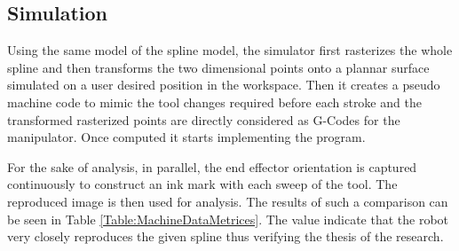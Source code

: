 \subsection{Simulation}
{
    Using the same model of the spline model, the simulator first rasterizes the whole spline and then transforms the two dimensional points onto a plannar surface simulated on a user desired position in the workspace. Then it creates a pseudo machine code to mimic the tool changes required before each stroke and the transformed rasterized points are directly considered as G-Codes for the manipulator. Once computed it starts implementing the program.

    For the sake of analysis, in parallel, the end effector orientation is captured continuously to construct an ink mark with each sweep of the tool. The reproduced image is then used for analysis. The results of such a comparison can be seen in Table \ref{Table:MachineDataMetrices}. The value indicate that the robot very closely reproduces the given spline thus verifying the thesis of the research.

    \begin{table}[ht]
    \centering
    \caption{Benchmark of the mathematical accuracy of the twisting bezier spline curves with a simulated manipulator}
    \label{Table:MachineDataMetrices}
    \end{table}
}
\clearpage        